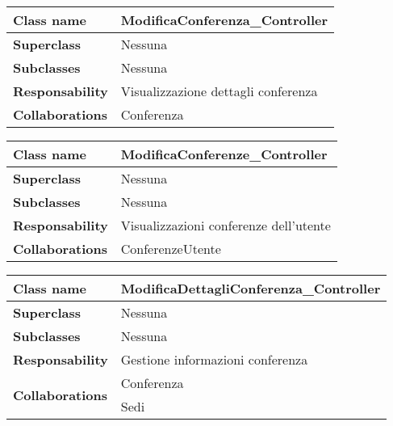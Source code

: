 \begin{table}[h!]
	\begin{tabular}{|l|l|}
		\hline 
		\textbf{Class name} & ModificaConferenza\_Controller
		\\ \hline
		\textbf{Superclass} & Nessuna
		\\ \hline
		\multirow{1}{*}{\textbf{Subclasses}} & Nessuna
		\\ \hline
		\textbf{Responsability} & Visualizzazione dettagli conferenza
		\\ \hline
		\multirow{1}{*}{\textbf{Collaborations}} & Conferenza
		\\ \hline
	\end{tabular}
\end{table}
\begin{table}[h!]
	\begin{tabular}{|l|l|}
		\hline 
		\textbf{Class name} & ModificaConferenze\_Controller
		\\ \hline
		\textbf{Superclass} & Nessuna
		\\ \hline
		\multirow{1}{*}{\textbf{Subclasses}} & Nessuna
		\\ \hline
		\textbf{Responsability} & Visualizzazioni conferenze dell'utente
		\\ \hline
		\multirow{1}{*}{\textbf{Collaborations}} & ConferenzeUtente
		\\ \hline
	\end{tabular}
\end{table}
\begin{table}[h!]
	\begin{tabular}{|l|l|}
		\hline 
		\textbf{Class name} & ModificaDettagliConferenza\_Controller
		\\ \hline
		\textbf{Superclass} & Nessuna
		\\ \hline
		\multirow{1}{*}{\textbf{Subclasses}} & Nessuna
		\\ \hline
		\textbf{Responsability} & Gestione informazioni conferenza
		\\ \hline
		\multirow{2}{*}{\textbf{Collaborations}} & Conferenza \\
		& Sedi 
		\\ \hline
	\end{tabular}
\end{table}
